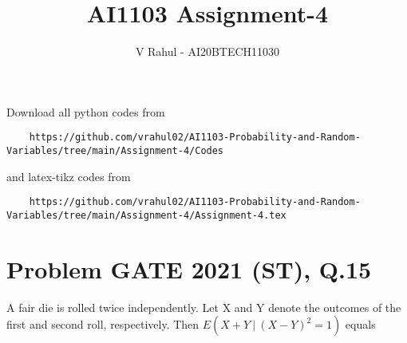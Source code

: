 \documentclass[journal,12pt,twocolumn]{IEEEtran}
\begin{document}
\let\StandardTheFigure\thefigure
\let\vec\mathbf
\renewcommand{\thefigure}{\theproblem}
\def\putbox#1#2#3{\makebox[0in][l]{\makebox[#1][l]{}\raisebox{\baselineskip}[0in][0in]{\raisebox{#2}[0in][0in]{#3}}}}
     \def\rightbox#1{\makebox[0in][r]{#1}}
     \def\centbox#1{\makebox[0in]{#1}}
     \def\topbox#1{\raisebox{-\baselineskip}[0in][0in]{#1}}
     \def\midbox#1{\raisebox{-0.5\baselineskip}[0in][0in]{#1}}
\vspace{3cm}
\title{AI1103 Assignment-4}
\author{V Rahul - AI20BTECH11030}
\maketitle
\newpage
\bigskip
\renewcommand{\thefigure}{\theenumi}
\renewcommand{\thetable}{\theenumi}


Download all python codes from 
\begin{lstlisting}
    https://github.com/vrahul02/AI1103-Probability-and-Random-Variables/tree/main/Assignment-4/Codes
\end{lstlisting}
%
and latex-tikz codes from 
%
\begin{lstlisting}
    https://github.com/vrahul02/AI1103-Probability-and-Random-Variables/tree/main/Assignment-4/Assignment-4.tex
\end{lstlisting}


\section*{Problem GATE 2021 (ST), Q.15}
A fair die is rolled twice independently. Let X and Y denote the outcomes of the first and second roll, respectively. Then $E(X+Y\:|\:(X-Y)^2=1)$ equals
\end{document}
